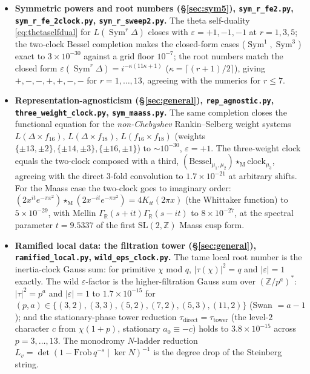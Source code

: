\documentclass[11pt]{article}
\theoremstyle{definition}
\newcommand{\Sym}{\operatorname{Sym}}
\begin{document}
\begin{itemize}
\item \textbf{Symmetric powers and root numbers (\S\ref{sec:sym5}), \texttt{sym\_r\_fe2.py},
\texttt{sym\_r\_fe\_2clock.py}, \texttt{sym\_r\_sweep2.py}.} The theta self-duality
\eqref{eq:thetaselfdual} for $L(\Sym^r\Delta)$ closes with $\varepsilon=+1,-1,-1$ at $r=1,3,5$; the
two-clock Bessel completion makes the closed-form cases ($\Sym^1,\Sym^3$) exact to $3\times10^{-30}$
against a grid floor $10^{-7}$; the root numbers match the closed form
$\varepsilon(\Sym^r\Delta)=i^{-\kappa(11\kappa+1)}$ ($\kappa=\lceil(r{+}1)/2\rceil$), giving
$+,-,-,+,+,-,-$ for $r=1,\dots,13$, agreeing with the numerics for $r\le7$.

\item \textbf{Representation-agnosticism (\S\ref{sec:general}), \texttt{rep\_agnostic.py},
\texttt{three\_weight\_clock.py}, \texttt{sym\_maass.py}.} The same completion closes the functional
equation for the \emph{non-Chebyshev} Rankin--Selberg weight systems $L(\Delta\times f_{16})$,
$L(\Delta\times f_{18})$, $L(f_{16}\times f_{18})$ (weights $\{\pm13,\pm2\},\{\pm14,\pm3\},\{\pm16,\pm1\}$)
to $\sim10^{-30}$, $\varepsilon=+1$. The three-weight clock equals the two-clock composed with a third,
$(\text{Bessel}_{\mu_1,\mu_2})\star_{\mathrm M}\text{clock}_{\mu_3}$, agreeing with the direct $3$-fold
convolution to $1.7\times10^{-21}$ at arbitrary shifts. For the Maass case the two-clock goes to
imaginary order: $(2x^{it}e^{-\pi x^2})\star_{\mathrm M}(2x^{-it}e^{-\pi x^2})=4K_{it}(2\pi x)$ (the
Whittaker function) to $5\times10^{-29}$, with Mellin $\Gamma_{\mathbb R}(s+it)\Gamma_{\mathbb R}(s-it)$
to $8\times10^{-27}$, at the spectral parameter $t=9.5337$ of the first $\mathrm{SL}(2,\mathbb Z)$ Maass
cusp form.

\item \textbf{Ramified local data: the filtration tower (\S\ref{sec:general}), \texttt{ramified\_local.py},
\texttt{wild\_eps\_clock.py}.} The tame local root number is the inertia-clock Gauss sum: for primitive
$\chi$ mod $q$, $|\tau(\chi)|^2=q$ and $|\varepsilon|=1$ exactly. The wild $\varepsilon$-factor is the
higher-filtration Gauss sum over $(\mathbb Z/p^a)^*$: $|\tau|^2=p^a$ and $|\varepsilon|=1$ to
$1.7\times10^{-15}$ for $(p,a)\in\{(3,2),(3,3),(5,2),(7,2),(5,3),(11,2)\}$ (Swan $=a-1$); and the
stationary-phase tower reduction $\tau_{\mathrm{direct}}=\tau_{\mathrm{tower}}$ (the level-$2$ character
$c$ from $\chi(1+p)$, stationary $a_0\equiv-c$) holds to $3.8\times10^{-15}$ across $p=3,\dots,13$. The
monodromy $N$-ladder reduction $L_v=\det(1-\mathrm{Frob}\,q^{-s}\mid\ker N)^{-1}$ is the degree drop of
the Steinberg string.


\end{itemize}
\end{document}
